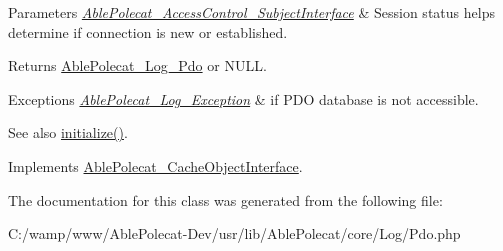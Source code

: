 \begin{DoxyParams}{Parameters}
{\em \hyperlink{interface_able_polecat___access_control___subject_interface}{Able\+Polecat\+\_\+\+Access\+Control\+\_\+\+Subject\+Interface}} & Session status helps determine if connection is new or established.\\
\hline
\end{DoxyParams}
\begin{DoxyReturn}{Returns}
\hyperlink{class_able_polecat___log___pdo}{Able\+Polecat\+\_\+\+Log\+\_\+\+Pdo} or N\+U\+L\+L. 
\end{DoxyReturn}

\begin{DoxyExceptions}{Exceptions}
{\em \hyperlink{class_able_polecat___log___exception}{Able\+Polecat\+\_\+\+Log\+\_\+\+Exception}} & if P\+D\+O database is not accessible. \\
\hline
\end{DoxyExceptions}
\begin{DoxySeeAlso}{See also}
\hyperlink{class_able_polecat___log___pdo_a91098fa7d1917ce4833f284bbef12627}{initialize()}. 
\end{DoxySeeAlso}


Implements \hyperlink{interface_able_polecat___cache_object_interface_a3f2135f6ad45f51d075657f6d20db2cd}{Able\+Polecat\+\_\+\+Cache\+Object\+Interface}.



The documentation for this class was generated from the following file\+:\begin{DoxyCompactItemize}
\item 
C\+:/wamp/www/\+Able\+Polecat-\/\+Dev/usr/lib/\+Able\+Polecat/core/\+Log/Pdo.\+php\end{DoxyCompactItemize}
